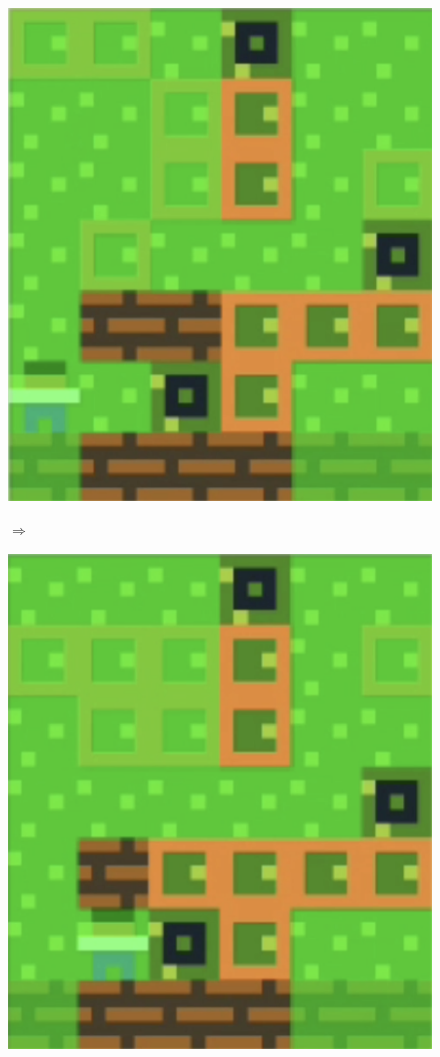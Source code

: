 \begin{figure}[!htbp]
\centering
\begin{minipage}[t]{0.2\textwidth}
\includegraphics[width=\textwidth]{figures/p8greena.png} \hfill \\
\end{minipage}
$\Longrightarrow$
\begin{minipage}[t]{0.2\textwidth}
\includegraphics[width=\textwidth]{figures/p8greenb.png} \hfill \\

\end{minipage}
\end{figure}
